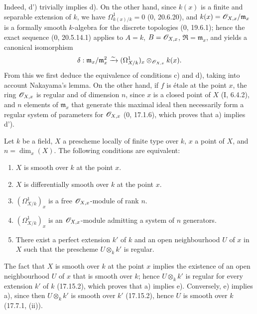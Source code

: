 Indeed, d') trivially implies d). On the other hand, since $k(x)$ is a finite and separable extension of $k$, we have $\Omega^1_{k(x)/k}=0$ (0, 20.6.20), and $k(x)=\mathscr{O}_{X,x}/\mathfrak m_x$ is a formally smooth $k$-algebra for the discrete topologies (0, 19.6.1); hence the exact sequence (0, 20.5.14.1) applies to $A=k$, $B=\mathscr{O}_{X,x}$, $\mathfrak{R}=\mathfrak m_x$, and yields a canonical isomorphism
\[
\delta:\mathfrak m_x/\mathfrak m_x^2\xrightarrow{\sim}(\Omega^1_{X/k})_x\otimes_{\mathscr{O}_{X,x}}k(x).
\]
From this we first deduce the equivalence of conditions c) and d), taking into account Nakayama's lemma. On the other hand, if $f$ is étale at the point $x$, the ring $\mathscr{O}_{X,x}$ is regular and of dimension $n$, since $x$ is a closed point of $X$ (I, 6.4.2), and $n$ elements of $\mathfrak m_x$ that generate this maximal ideal then necessarily form a regular system of parameters for $\mathscr{O}_{X,x}$ (0, 17.1.6), which proves that a) implies d').

\begin{proposition}[17.15.5]
\label{IV.17.15.5}
Let $k$ be a field, $X$ a prescheme locally of finite type over $k$, $x$ a point of $X$, and $n=\dim_x(X)$. The following conditions are equivalent:
\begin{enumerate}
  \item[a)] $X$ is smooth over $k$ at the point $x$.
  \item[b)] $X$ is differentially smooth over $k$ at the point $x$.
  \item[c)] $(\Omega^1_{X/k})_x$ is a free $\mathscr{O}_{X,x}$-module of rank $n$.
  \item[d)] $(\Omega^1_{X/k})_x$ is an $\mathscr{O}_{X,x}$-module admitting a system of $n$ generators.


  \item[e)] There exist a perfect extension $k'$ of $k$ and an open neighbourhood $U$ of $x$ in $X$ such that the prescheme $U\otimes_k k'$ is regular.
\end{enumerate}
\end{proposition}

The fact that $X$ is smooth over $k$ at the point $x$ implies the existence of an open neighbourhood $U$ of $x$ that is smooth over $k$; hence $U\otimes_k k'$ is regular for every extension $k'$ of $k$ (17.15.2), which proves that a) implies e). Conversely, e) implies a), since then $U\otimes_k k'$ is smooth over $k'$ (17.15.2), hence $U$ is smooth over $k$ (17.7.1, (ii)).

